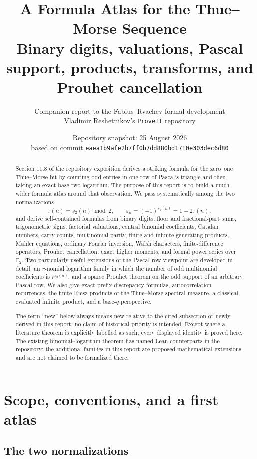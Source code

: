 \documentclass[11pt,oneside]{article}
\title{\bfseries A Formula Atlas for the Thue--Morse Sequence\\[0.35em]
\large Binary digits, valuations, Pascal support, products, transforms, and Prouhet cancellation}
\author{Companion report to the Fabius--Rvachev formal development\\
\small Vladimir Reshetnikov's \texttt{ProveIt} repository}
\date{Repository snapshot: 25 August 2026\\
\small based on commit \nolinkurl{eaea1b9afe2b7ff0b7dd880bd1710e303dec6d80}}
\theoremstyle{definition}
\theoremstyle{remark}
\newcommand{\F}{\mathbb F}
\newcommand{\swt}{s_2}
\newcommand{\eps}{\varepsilon}
\newcommand{\1}{\mathbf 1}
\begin{document}
\maketitle

\begin{abstract}
Section 11.8 of the repository exposition derives a striking formula for the zero--one
Thue--Morse bit by counting odd entries in one row of Pascal's triangle and then taking an
exact base-two logarithm.  The purpose of this report is to build a much wider formula atlas
around that observation.  We pass systematically among the two normalizations
\[
  \tau(n)=\swt(n)\bmod 2,\qquad
  \eps_n=(-1)^{\swt(n)}=1-2\tau(n),
\]
and derive self-contained formulas from binary digits, floor and fractional-part sums,
trigonometric signs, factorial valuations, central binomial coefficients, Catalan numbers,
carry counts, multinomial parity, finite and infinite generating products, Mahler equations,
ordinary Fourier inversion, Walsh characters, finite-difference operators, Prouhet
cancellation, exact higher moments, and formal power series over \(\F_2\).  Two particularly
useful extensions of the Pascal-row viewpoint are developed in detail: an \(r\)-nomial
logarithm family in which the number of odd multinomial coefficients is
\(r^{\swt(n)}\), and a sparse Prouhet theorem on the odd support of an arbitrary Pascal row.
We also give exact prefix-discrepancy formulas, autocorrelation recurrences, the finite Riesz
products of the Thue--Morse spectral measure, a classical evaluated infinite product, and a
base-\(q\) perspective.

The term ``new'' below always means new relative to the cited subsection or newly derived in
this report; no claim of historical priority is intended.  Except where a literature theorem
is explicitly labelled as such, every displayed identity is proved here.  The existing
binomial--logarithm theorem has named Lean counterparts in the repository; the additional
families in this report are proposed mathematical extensions and are not claimed to be
formalized there.
\end{abstract}

\tableofcontents
\newpage

\section{Scope, conventions, and a first atlas}
\label{p3:sec:scope}

\subsection{The two normalizations}
\end{document}
